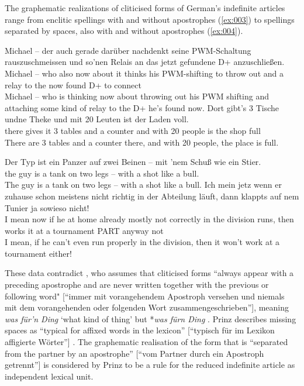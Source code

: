 The graphematic realizations of cliticised forms of German's indefinite articles range from enclitic spellings with and without apostrophes (\ref{ex:003}) to spellings separated by spaces, also with and without apostrophes (\ref{ex:004}).

\begin{exe}
	\ex\label{ex:003}
	\begin{xlist}
		\ex\label{ex:0006}\gll Michael -- der auch gerade darüber nachdenkt seine PWM-Schaltung rauszuschmeissen und so'nen Relais an das jetzt gefundene D+ anzuschließen.\\
		Michael -- who also now {about it} thinks his PWM-shifting {to throw out} and a relay to the now found D+ {to connect}\\
		\trans Michael -- who is thinking now about throwing out his PWM shifting and attaching some kind of relay to the D+ he's found now.
		\ex\label{ex:0007}\gll Dort gibt's 3 Tische undne Theke und mit 20 Leuten ist der Laden voll.\\
		there {gives it} 3 tables {and a} counter and with 20 people is the shop full\\
		\trans There are 3 tables and a counter there, and with 20 people, the place is full.
	\end{xlist}
	\ex\label{ex:004}
	\begin{xlist}
		\ex\label{ex:0008}\gll Der Typ ist ein Panzer auf zwei Beinen -- mit 'nem Schuß wie ein Stier.\\
		the guy is a tank on two legs -- with a shot like a bull.\\
		\trans The guy is a tank on two legs -- with a shot like a bull.
		\ex\label{ex:0009}\gll Ich mein jetz wenn er zuhause schon meistens nicht richtig in der Abteilung läuft, dann klappts auf nem Tunier ja sowieso nicht!\\
		I mean now if he {at home} already mostly not correctly in the division runs, then {works it} at a tournament PART anyway not\\
		\trans I mean, if he can't even run properly in the division, then it won't work at a tournament either!
	\end{xlist}	
\end{exe}

These data contradict \citet{Prinz1991}, who assumes that cliticised forms ``always appear with a preceding apostrophe and are never written together with the previous or following word" [``immer mit vorangehendem Apostroph versehen und niemals mit dem vorangehenden oder folgenden Wort zusammengeschrieben''], meaning \textit{was für'n Ding} `what kind of thing' but *\textit{was fürn Ding} \citep[114]{Prinz1991}. 
Prinz describes missing spaces as ``typical for affixed words in the lexicon'' [``typisch für im Lexikon affigierte Wörter''] \citep[101]{Prinz1991}.
The graphematic realisation of the form that is ``separated from the partner by an apostrophe'' [``vom Partner durch ein Apostroph getrennt''] is considered by Prinz to be a rule for the reduced indefinite article as independent lexical unit.

